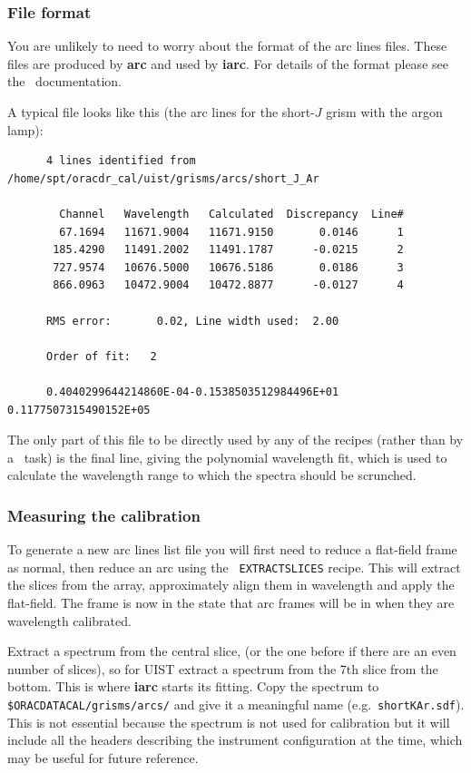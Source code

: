 \documentclass[twoside,11pt]{article}
\newcommand{\xref}[3]{#1}
\renewcommand{\_}{\texttt{\symbol{95}}}
\newcommand{\FIGARO}{\xref{{\sc{Figaro}}}{sun86}{}}
\begin{document}
\subsubsection{File format}

You are unlikely to need to worry about the format of the arc lines
files. These files are produced by \xref{{\bf arc}}{sun86}{ARC} and
used by \xref{{\bf iarc}}{sun86}{IARC}. For details of the format
please see the \FIGARO\ documentation.

A typical file looks like this (the arc lines for the short-$J$ grism
with the argon lamp):

\begin{verbatim}
      4 lines identified from /home/spt/oracdr_cal/uist/grisms/arcs/short_J_Ar

        Channel   Wavelength   Calculated  Discrepancy  Line#
        67.1694   11671.9004   11671.9150       0.0146      1
       185.4290   11491.2002   11491.1787      -0.0215      2
       727.9574   10676.5000   10676.5186       0.0186      3
       866.0963   10472.9004   10472.8877      -0.0127      4

      RMS error:       0.02, Line width used:  2.00

      Order of fit:   2

      0.4040299644214860E-04-0.1538503512984496E+01 0.1177507315490152E+05
\end{verbatim}

The only part of this file to be directly used by any of the recipes
(rather than by a \FIGARO\ task) is the final line, giving the
polynomial wavelength fit, which is used to calculate the wavelength
range to which the spectra should be scrunched.

\subsubsection{Measuring the calibration}

To generate a new arc lines list file you will first need to reduce a
flat-field frame as normal, then reduce an arc using the {\tt
  EXTRACT\_SLICES} recipe. This will extract the slices from the
array, approximately align them in wavelength and apply the
flat-field. The frame is now in the state that arc frames will be in
when they are wavelength calibrated.

Extract a spectrum from the central slice, (or the one before if there
are an even number of slices), so for UIST extract a spectrum from the
7th slice from the bottom. This is where \xref{{\bf
    iarc}}{sun86}{IARC} starts its fitting. Copy the spectrum to {\tt
  \$ORAC\_DATA\_CAL/grisms/arcs/} and give it a meaningful name (e.g.\
{\tt short\_K\_Ar.sdf}). This is not essential because the spectrum is
not used for calibration but it will include all the headers
describing the instrument configuration at the time, which may be
useful for future reference.
\end{document}
